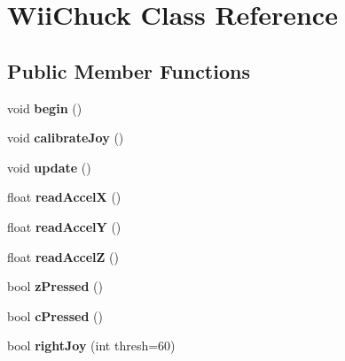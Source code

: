 \hypertarget{classWiiChuck}{}\section{Wii\+Chuck Class Reference}
\label{classWiiChuck}
\subsection*{Public Member Functions}
\begin{DoxyCompactItemize}
\item 
void {\bfseries begin} ()\hypertarget{classWiiChuck_ab6ae86c1dba1ac589dc9007beda80083}{}\label{classWiiChuck_ab6ae86c1dba1ac589dc9007beda80083}

\item 
void {\bfseries calibrate\+Joy} ()\hypertarget{classWiiChuck_a2b8d8551a171a828117c20979af37e78}{}\label{classWiiChuck_a2b8d8551a171a828117c20979af37e78}

\item 
void {\bfseries update} ()\hypertarget{classWiiChuck_af5c8f45b117b3222bbf746d8176b912f}{}\label{classWiiChuck_af5c8f45b117b3222bbf746d8176b912f}

\item 
float {\bfseries read\+AccelX} ()\hypertarget{classWiiChuck_ae72d67226c8be4598feeb1f40579143e}{}\label{classWiiChuck_ae72d67226c8be4598feeb1f40579143e}

\item 
float {\bfseries read\+AccelY} ()\hypertarget{classWiiChuck_a5e1c7371b1eb3dd9ee5575d26ab96b90}{}\label{classWiiChuck_a5e1c7371b1eb3dd9ee5575d26ab96b90}

\item 
float {\bfseries read\+AccelZ} ()\hypertarget{classWiiChuck_a78726a5a22fd605e670d8ef064111143}{}\label{classWiiChuck_a78726a5a22fd605e670d8ef064111143}

\item 
bool {\bfseries z\+Pressed} ()\hypertarget{classWiiChuck_a93a43fca891ab77f00d19085fac9ab6d}{}\label{classWiiChuck_a93a43fca891ab77f00d19085fac9ab6d}

\item 
bool {\bfseries c\+Pressed} ()\hypertarget{classWiiChuck_a1e69cdd8e19bd534cd8ff80da91bd1c0}{}\label{classWiiChuck_a1e69cdd8e19bd534cd8ff80da91bd1c0}

\item 
bool {\bfseries right\+Joy} (int thresh=60)\hypertarget{classWiiChuck_a5d197a474677d2a81cb0f90d78ffc6d8}{}\label{classWiiChuck_a5d197a474677d2a81cb0f90d78ffc6d8}


\end{DoxyCompactItemize}
